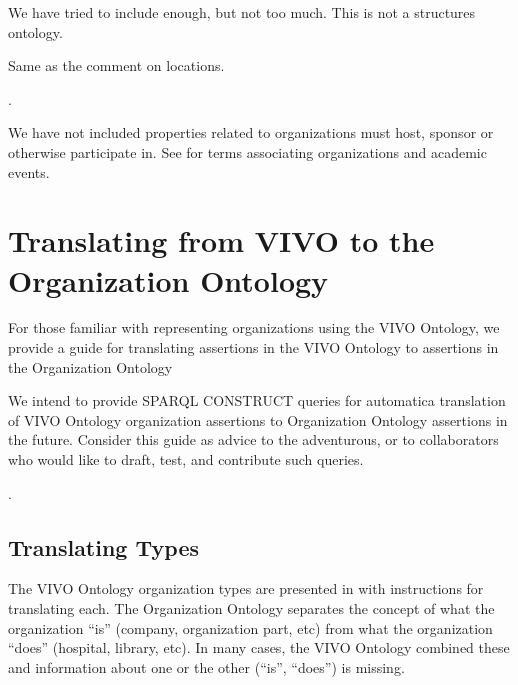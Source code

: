 \documentclass[letterpaper,10pt,english]{sphinxmanual}
\begin{document}
\begin{sphinxShadowBox}

\sphinxAtStartPar
We have tried to include enough, but not too much.  This is not a structures
ontology. %
\begin{footnote}[3]\sphinxAtStartFootnote
Same as the comment on locations.
%
\end{footnote}.
\end{sphinxShadowBox}

\begin{sphinxShadowBox}

\sphinxAtStartPar
We have not included properties related to organizations must host, sponsor or otherwise
participate in.  See  for terms associating
organizations and academic events.
\end{sphinxShadowBox}


\chapter{Translating from VIVO to the Organization Ontology}
\label{\detokenize{vivo-to-org:translating-from-vivo-to-the-organization-ontology}}\label{\detokenize{vivo-to-org::doc}}
\sphinxAtStartPar
For those familiar with representing organizations using the VIVO Ontology,
we provide a guide for translating assertions in the VIVO Ontology to assertions
in the Organization Ontology %
\begin{footnote}[1]\sphinxAtStartFootnote
We intend to provide SPARQL CONSTRUCT queries for automatica translation of
VIVO Ontology organization assertions to Organization Ontology assertions
in the future.  Consider this guide as advice to the adventurous, or to collaborators
who would like to draft, test, and contribute such queries.
%
\end{footnote}.


\section{Translating Types}
\label{\detokenize{vivo-to-org:translating-types}}
\sphinxAtStartPar
The VIVO Ontology organization types are presented in {\hyperref[\detokenize{vivo-to-org:table-17}]{}} with instructions
for translating each.  The Organization Ontology separates the concept of
what the organization “is” (company, organization part, etc) from what the
organization “does” (hospital, library, etc).  In many cases, the VIVO Ontology
combined these and information about one or the other (“is”, “does”) is missing.
\end{document}

